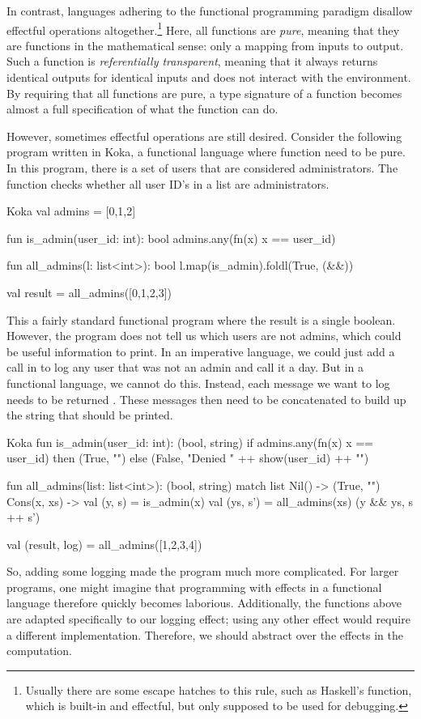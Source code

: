 In contrast, languages adhering to the functional programming paradigm disallow effectful operations altogether.\footnote{Usually there are some escape hatches to this rule, such as Haskell's  function, which is built-in and effectful, but only supposed to be used for debugging.} Here, all functions are \emph{pure}, meaning that they are functions in the mathematical sense: only a mapping from inputs to output. Such a function is \emph{referentially transparent}, meaning that it always returns identical outputs for identical inputs and does not interact with the environment. By requiring that all functions are pure, a type signature of a function becomes almost a full specification of what the function can do.

However, sometimes effectful operations are still desired. Consider the following program written in Koka, a functional language where function need to be pure. In this program, there is a set of users that are considered administrators. The  function checks whether all user ID's in a list are administrators.

\begin{lst}{Koka}
val admins = [0,1,2]

fun is_admin(user_id: int): bool
  admins.any(fn(x) x == user_id)

fun all_admins(l: list<int>): bool
  l.map(is_admin).foldl(True, (&&))

val result = all_admins([0,1,2,3])    
\end{lst}
%
This a fairly standard functional program where the result is a single boolean. However, the program does not tell us which users are not admins, which could be useful information to print. In an imperative language, we could just add a  call in  to log any user that was not an admin and call it a day. But in a functional language, we cannot do this. Instead, each message we want to log needs to be returned . These messages then need to be concatenated to build up the string that should be printed.

\begin{lst}{Koka}
fun is_admin(user_id: int): (bool, string)
  if admins.any(fn(x) x == user_id)
  then (True, "")
  else (False, "Denied " ++ show(user_id) ++ "\n")

fun all_admins(list: list<int>): (bool, string)
  match list
    Nil() -> (True, "")
    Cons(x, xs) ->
      val (y, s) = is_admin(x)
      val (ys, s') = all_admins(xs)
      (y && ys, s ++ s')

val (result, log) = all_admins([1,2,3,4])
\end{lst}
%
So, adding some logging made the program much more complicated. For larger programs, one might imagine that programming with effects in a functional language therefore quickly becomes laborious. Additionally, the functions above are adapted specifically to our logging effect; using any other effect would require a different implementation. Therefore, we should abstract over the effects in the computation.

